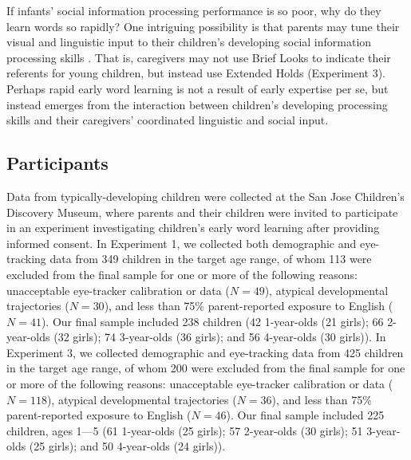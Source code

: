 \documentclass{pnastwo}
\begin{document}
\begin{article}
If infants' social information processing performance is so poor, why do they learn words so rapidly? One intriguing possibility is that parents may tune their visual and linguistic input to their children's developing social information processing skills \citep{snow1972,gogate2000,brand2002}. That is, caregivers may not use Brief Looks to indicate their referents for young children, but instead use Extended Holds (Experiment 3). Perhaps rapid early word learning is not a result of early expertise per se, but instead emerges from the interaction between children's developing processing skills and their caregivers' coordinated linguistic and social input.

\begin{materials}

\setlength{\parskip}{0em}

\subsection{Participants} Data from typically-developing children were collected at the San Jose Children's Discovery Museum, where parents and their children were invited to participate in an experiment investigating children's early word learning after providing informed consent. In Experiment 1, we collected both demographic and eye-tracking data from 349 children in the target age range, of whom 113 were excluded from the final sample for one or more of the following reasons: unacceptable eye-tracker calibration or data ({\small$N=49$}), atypical developmental trajectories ({\small$N=30$}), and less than 75\% parent-reported exposure to English ({\small$N=41$}). Our final sample included 238 children (42 1-year-olds (21 girls); 66 2-year-olds (32 girls); 74 3-year-olds (36 girls); and 56 4-year-olds (30 girls)). In Experiment 3, we collected demographic and eye-tracking data from 425 children in the target age range, of whom 200 were excluded from the final sample for one or more of the following reasons: unacceptable eye-tracker calibration or data ({\small$N=118$}), atypical developmental trajectories ({\small$N=36$}), and less than 75\% parent-reported exposure to English ({\small$N=46$}). Our final sample included 225 children, ages 1---5 (61 1-year-olds (25 girls); 57 2-year-olds (30 girls); 51 3-year-olds (25 girls); and 50 4-year-olds (24 girls)).


\end{materials}
\end{article}
\end{document}
